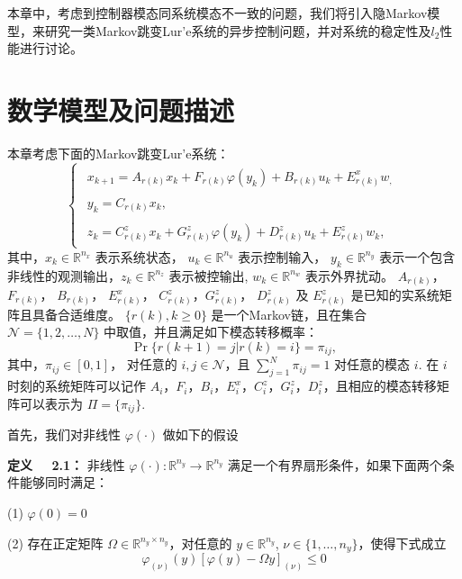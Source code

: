 	本章中，考虑到控制器模态同系统模态不一致的问题，我们将引入隐Markov模型，来研究一类Markov跳变Lur'e系统的异步控制问题，并对系统的稳定性及$l_2$性能进行讨论。

\section{数学模型及问题描述}
	本章考虑下面的Markov跳变Lur'e系统：
	\begin{equation}\label{syseq}\left\{
	\begin{array}{lr}
		\begin{split}
			x_{k+1}=A_{r(k)}x_k+F_{r(k)}\varphi(y_k)+B_{r(k)}u_k +E^x_{r(k)}w_,
		\end{split}\\
		\begin{split}
			y_k=C_{r(k)}x_k,
		\end{split}
		\\
		\begin{split}
			z_k= C^z_{r(k)}x_k+G^z_{r(k)}\varphi(y_k)+D^z_{r(k)}u_k+E^z_{r(k)}w_k,
		\end{split}	
	\end{array}\right.
	\end{equation}
	其中，$x_k\in\mathbb{R}^{n_x}$ 表示系统状态， $u_k\in\mathbb{R}^{n_u}$ 表示控制输入， $y_k\in\mathbb{R}^{n_y}$ 表示一个包含非线性的观测输出，$ z_k\in\mathbb{R}^{n_z}$ 表示被控输出, $w_k\in\mathbb{R}^{n_w}$ 表示外界扰动。 $A_{r(k)}$， $F_{r(k)}$， $B_{r(k)}$， $E^x_{r(k)}$， $C^z_{r(k)}$，$G^z_{r(k)}$， $D^z_{r(k)}$ 及 $E^z_{r(k)}$ 是已知的实系统矩阵且具备合适维度。
	$\{r(k),k\geq0\}$ 是一个Markov链，且在集合 $\mathcal{N}=\{1,2,\dots,N\}$ 中取值，并且满足如下模态转移概率：
	\begin{equation}
	\Pr\{r(k+1)=j|r(k)=i\}=\pi_{ij},
	\end{equation}
	其中，$\pi_{ij}\in[0,1]$， 对任意的 $i,j\in\mathcal{N}$，且 $\sum_{j=1}^{N}\pi_{ij}=1$ 对任意的模态 $i$. 在 $i$ 时刻的系统矩阵可以记作 $A_i$，$F_i$，$B_i$，$E^x_i$，$C^z_i$，$G^z_i$，$D^z_i$，且相应的模态转移矩阵可以表示为 $\varPi=\{\pi_{ij}\}$.
	
	首先，我们对非线性 $\varphi(\cdot)$ 做如下的假设
	
	{\bf 定义 \ \ 2.1：} 
	非线性 $\varphi(\cdot): \mathbb{R}^{n_y}\rightarrow\mathbb{R}^{n_y}$ 满足一个有界扇形条件，如果下面两个条件能够同时满足：
		
		(1) $\varphi(0)=0$ 
		
		(2) 存在正定矩阵 $\varOmega \in\mathbb{R}^{n_y\times n_y}$，对任意的 $y\in\mathbb{R}^{n_y}$, $\nu \in\{1,\dots,n_y\}$，使得下式成立 
		\begin{equation}\label{cbs} 
		\varphi_{(\nu)}(y)[\varphi(y)-\varOmega y ]_{(\nu)}\leq 0
		\end{equation}
		
